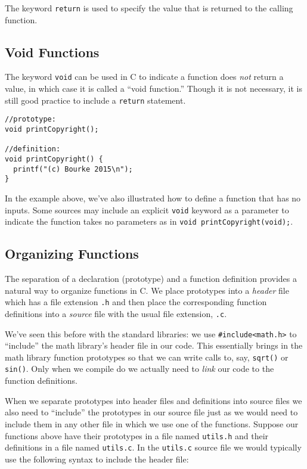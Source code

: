 The keyword \texttt{return} is used to specify the value
that is returned to the calling function.

\subsection{Void Functions}

The keyword \texttt{void} can be used in C to indicate
a function does \emph{not} return a value, in which case it is
called a ``void function.''  Though it is not necessary, it is still
good practice to include a \texttt{return} statement.

\begin{verbatim}
//prototype:
void printCopyright();

//definition:
void printCopyright() {
  printf("(c) Bourke 2015\n");
}
\end{verbatim}

In the example above, we've also illustrated how to define a 
function that has no inputs.  Some sources may include an 
explicit \texttt{void} keyword as a parameter to indicate
the function takes no parameters as in \texttt{void printCopyright(void);}.

\subsection{Organizing Functions}

The separation of a declaration (prototype) and a function definition
provides a natural way to organize functions in C.  We place 
prototypes into a \emph{header} file which has a file extension
\texttt{.h} and then place the corresponding function
definitions into a \emph{source} file with the usual file extension, 
\texttt{.c}.

We've seen this before with the standard libraries: we use
\texttt{#include<math.h>} to ``include'' the math library's
header file in our code.  This essentially brings in the math
library function prototypes so that we can write calls to, say, 
\texttt{sqrt()} or \texttt{sin()}.  Only when we compile 
do we actually need to \emph{link} our code to the function definitions.

When we separate prototypes into header files and definitions into
source files we also need to ``include'' the prototypes in our source file
just as we would need to include them in any other file in which we
use one of the functions.  Suppose our functions above have their
prototypes in a file named \texttt{utils.h} and their definitions
in a file named \texttt{utils.c}.  In the \texttt{utils.c}
source file we would typically use the following syntax to include
the header file:

